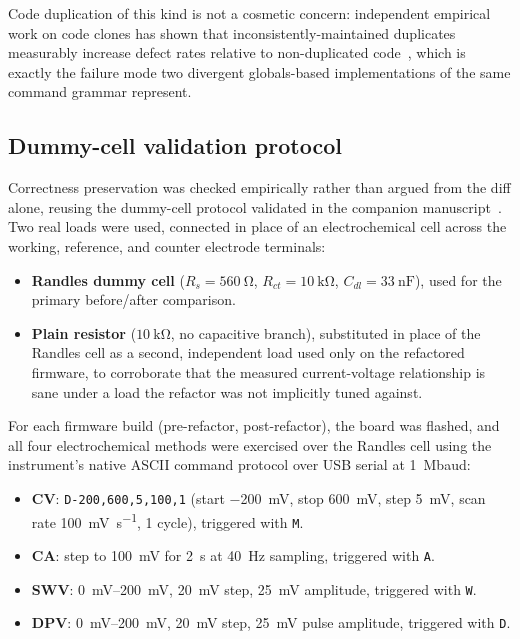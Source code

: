 Code duplication of this kind is not a cosmetic concern: independent
empirical work on code clones has shown that inconsistently-maintained
duplicates measurably increase defect rates relative to non-duplicated
code~\cite{juergens2009clones}, which is exactly the failure mode two
divergent globals-based implementations of the same command grammar
represent.

\subsection{Dummy-cell validation protocol}
\label{sec:protocol}
Correctness preservation was checked empirically rather than argued from
the diff alone, reusing the dummy-cell protocol validated in the companion
manuscript~\cite{clement2026linearity}. Two real loads were used, connected
in place of an electrochemical cell across the working, reference, and
counter electrode terminals:

\begin{itemize}
\item \textbf{Randles dummy cell} ($R_s=\SI{560}{\ohm}$,
  $R_{ct}=\SI{10}{\kilo\ohm}$, $C_{dl}=\SI{33}{\nano\farad}$), used for the
  primary before/after comparison.
\item \textbf{Plain resistor} ($\SI{10}{\kilo\ohm}$, no capacitive branch),
  substituted in place of the Randles cell as a second, independent load
  used only on the refactored firmware, to corroborate that the measured
  current-voltage relationship is sane under a load the refactor was not
  implicitly tuned against.
\end{itemize}

For each firmware build (pre-refactor, post-refactor), the board was
flashed, and all four electrochemical methods were exercised over the
Randles cell using the instrument's native ASCII command protocol over USB
serial at \SI{1}{\mega baud}:

\begin{itemize}
\item \textbf{CV}: \texttt{D-200,600,5,100,1} (start \SI{-200}{\milli\volt},
  stop \SI{600}{\milli\volt}, step \SI{5}{\milli\volt}, scan rate
  \SI{100}{\milli\volt\per\second}, 1 cycle), triggered with \texttt{M}.
\item \textbf{CA}: step to \SI{100}{\milli\volt} for \SI{2}{\second} at
  \SI{40}{\hertz} sampling, triggered with \texttt{A}.
\item \textbf{SWV}: \SIrange{0}{200}{\milli\volt}, \SI{20}{\milli\volt}
  step, \SI{25}{\milli\volt} amplitude, triggered with \texttt{W}.
\item \textbf{DPV}: \SIrange{0}{200}{\milli\volt}, \SI{20}{\milli\volt}
  step, \SI{25}{\milli\volt} pulse amplitude, triggered with \texttt{D}.
\end{itemize}

